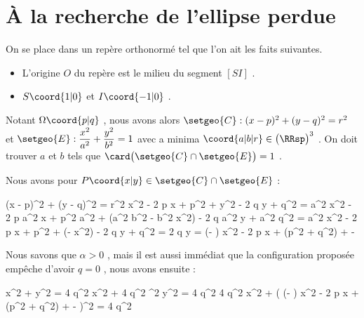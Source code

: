 \documentclass[12pt]{amsart}
\begin{document}


\section{À la recherche de l'ellipse perdue}

On se place dans un repère orthonormé tel que l'on ait les faits suivantes.

\begin{itemize}[label=\small\textbullet]
	\item L'origine $O$ du repère est le milieu du segment $[SI]$ .

	\item $S\coord{1 | 0}$ et $I\coord{-1 | 0}$ .
\end{itemize}


Notant $\Omega\coord{p | q}$ , nous avons alors
$\setgeo{C} : (x - p)^2 + (y - q)^2 = r^2$
et
$\setgeo{E} : \dfrac{x^2}{a^2} + \dfrac{y^2}{b^2} = 1$ avec a minima $\coord{a | b | r} \in \big(\RRsp\big)^3$ .
On doit trouver $a$ et $b$ tels que $\card \big( \setgeo{C} \cap \setgeo{E} \big) = 1$ .


\newpage


Nous avons pour $P\coord{x | y} \in \setgeo{C} \cap \setgeo{E}$ :

\medskip

\begin{stepcalc}[style=ar*, ope=\implies]
	(x - p)^2 + (y - q)^2 = r^2
	x^2 - 2 p x + p^2 + y^2 - 2 q y + q^2 = \rho
{}
	a^2 x^2 - 2 p a^2 x + p^2 a^2 + (a^2 b^2 - b^2 x^2) - 2 q a^2 y + a^2 q^2 = a^2 \rho
{}
	\alpha x^2 - 2 p \alpha x + p^2 \alpha + (\gamma - \beta x^2) - 2 q \alpha y + \alpha q^2 = \alpha \rho
\explnext{}
      2 q \alpha y
    =
	  (\alpha - \beta) x^2 
	- 2 p \alpha x 
	+ \alpha(p^2 + q^2) 
	+ \gamma - \alpha \rho
\end{stepcalc}

\medskip

Nous savons que $\alpha > 0$ , mais il est aussi immédiat que la configuration proposée empêche d'avoir $q = 0$ , nous avons ensuite :

\medskip

\begin{stepcalc}[style=ar*, ope=\implies]
	\beta x^2 + \alpha y^2 = \gamma
\explnext{}
    4 q^2 \alpha \beta x^2 + 4 q^2 \alpha^2 y^2 = 4 q^2 \alpha \gamma
\explnext{}
    4 q^2 \alpha \beta x^2 
    + 
    \big(
    	(\alpha - \beta) x^2 
	- 2 p \alpha x 
	+ \alpha(p^2 + q^2) 
	+ \gamma - \alpha \rho
    \big)^2
    =
    4 q^2 \alpha \gamma
\end{stepcalc}
\end{document}
